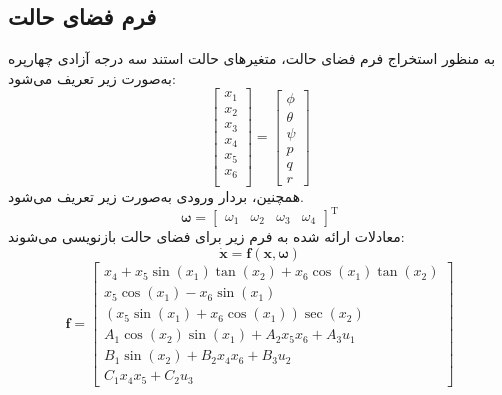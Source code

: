 \documentclass{CCI2020}
\begin{document}
\subsection{ فرم فضای حالت}
به منظور استخراج فرم فضای حالت، متغیرهای حالت استند سه درجه آزادی چهارپره به‌صورت زیر تعریف می‌شود:
\begin{equation}
	\begin{bmatrix}
		x_1\\x_2\\x_3\\x_4\\x_5\\x_6\\
	\end{bmatrix} = 
	\begin{bmatrix}
		\phi\\ \theta \\ \psi \\ p\\ q\\ r
	\end{bmatrix}
\end{equation}
همچنین، بردار ورودی به‌صورت زیر تعریف می‌شود.
\begin{equation}
	\boldsymbol{\omega} = \begin{bmatrix}
		\omega_1&\omega_2&\omega_3&\omega_4
	\end{bmatrix}^\mathrm{T}
\end{equation}
معادلات ارائه شده به فرم زیر برای فضای حالت بازنویسی می‌شوند:
\begin{equation}
	\boldsymbol{\dot x} = \boldsymbol f(\boldsymbol x, \boldsymbol{\omega})
\end{equation}
\begin{equation}
	\boldsymbol f = \begin{bmatrix}
		x_4 + x_5\sin(x_1)\tan(x_2) + x_6\cos(x_1)\tan(x_2)\\
		x_5\cos(x_1)- x_6\sin(x_1)\\
		(x_5\sin(x_1) + x_6\cos(x_1))\sec(x_2)\\
		A_1\cos(x_2)\sin(x_1) + 
		A_2x_5x_6 + A_3u_1
		\\
		B_1\sin(x_2) + 
		B_2x_4x_6 + B_3u_2\\
		C_1x_4x_5 + 
		C_2u_3
	\end{bmatrix}
\end{equation} 
\label{IntroMainFeat}
\end{document}
